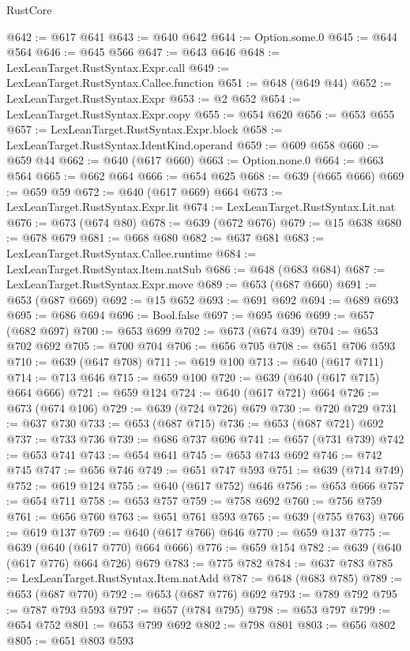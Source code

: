 \begin{lexlean}{RustCore}
\begin{coremodule}
@642 := @617 @641
@643 := @640 @642
@644 := Option.some.{0}
@645 := @644 @564
@646 := @645 @566
@647 := @643 @646
@648 := LexLeanTarget.RustSyntax.Expr.call
@649 := LexLeanTarget.RustSyntax.Callee.function
@651 := @648 (@649 @44)
@652 := LexLeanTarget.RustSyntax.Expr
@653 := @2 @652
@654 := LexLeanTarget.RustSyntax.Expr.copy
@655 := @654 @620
@656 := @653 @655
@657 := LexLeanTarget.RustSyntax.Expr.block
@658 := LexLeanTarget.RustSyntax.IdentKind.operand
@659 := @609 @658
@660 := @659 @44
@662 := @640 (@617 @660)
@663 := Option.none.{0}
@664 := @663 @564
@665 := @662 @664
@666 := @654 @625
@668 := @639 (@665 @666)
@669 := @659 @59
@672 := @640 (@617 @669) @664
@673 := LexLeanTarget.RustSyntax.Expr.lit
@674 := LexLeanTarget.RustSyntax.Lit.nat
@676 := @673 (@674 @80)
@678 := @639 (@672 @676)
@679 := @15 @638
@680 := @678 @679
@681 := @668 @680
@682 := @637 @681
@683 := LexLeanTarget.RustSyntax.Callee.runtime
@684 := LexLeanTarget.RustSyntax.Item.natSub
@686 := @648 (@683 @684)
@687 := LexLeanTarget.RustSyntax.Expr.move
@689 := @653 (@687 @660)
@691 := @653 (@687 @669)
@692 := @15 @652
@693 := @691 @692
@694 := @689 @693
@695 := @686 @694
@696 := Bool.false
@697 := @695 @696
@699 := @657 (@682 @697)
@700 := @653 @699
@702 := @673 (@674 @39)
@704 := @653 @702 @692
@705 := @700 @704
@706 := @656 @705
@708 := @651 @706 @593
@710 := @639 (@647 @708)
@711 := @619 @100
@713 := @640 (@617 @711)
@714 := @713 @646
@715 := @659 @100
@720 := @639 (@640 (@617 @715) @664 @666)
@721 := @659 @124
@724 := @640 (@617 @721) @664
@726 := @673 (@674 @106)
@729 := @639 (@724 @726) @679
@730 := @720 @729
@731 := @637 @730
@733 := @653 (@687 @715)
@736 := @653 (@687 @721) @692
@737 := @733 @736
@739 := @686 @737 @696
@741 := @657 (@731 @739)
@742 := @653 @741
@743 := @654 @641
@745 := @653 @743 @692
@746 := @742 @745
@747 := @656 @746
@749 := @651 @747 @593
@751 := @639 (@714 @749)
@752 := @619 @124
@755 := @640 (@617 @752) @646
@756 := @653 @666
@757 := @654 @711
@758 := @653 @757
@759 := @758 @692
@760 := @756 @759
@761 := @656 @760
@763 := @651 @761 @593
@765 := @639 (@755 @763)
@766 := @619 @137
@769 := @640 (@617 @766) @646
@770 := @659 @137
@775 := @639 (@640 (@617 @770) @664 @666)
@776 := @659 @154
@782 := @639 (@640 (@617 @776) @664 @726) @679
@783 := @775 @782
@784 := @637 @783
@785 := LexLeanTarget.RustSyntax.Item.natAdd
@787 := @648 (@683 @785)
@789 := @653 (@687 @770)
@792 := @653 (@687 @776) @692
@793 := @789 @792
@795 := @787 @793 @593
@797 := @657 (@784 @795)
@798 := @653 @797
@799 := @654 @752
@801 := @653 @799 @692
@802 := @798 @801
@803 := @656 @802
@805 := @651 @803 @593

\end{coremodule}
\end{lexlean}
